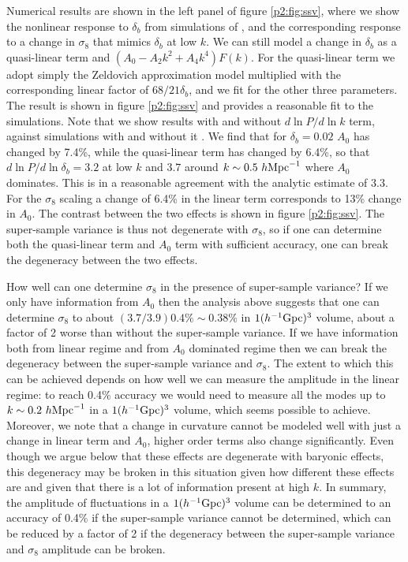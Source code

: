 \documentclass[
  11pt,
  twoside,
  openright,
  titlepage,
  headings=optiontoheadandtoc
]{scrbook}
\begin{document}
Numerical results are shown in the left panel of figure \ref{p2:fig:ssv}, where we show the nonlinear response to $\delta_b$ from 
simulations of \cite{2014PhRvD..89h3519L}, and the corresponding response to a change in $\sigma_8$ that mimics 
$\delta_b$ at low $k$. 
We can still model a change in $\delta_b$
as a quasi-linear term and $(A_0-A_2k^2+A_4k^4)F(k)$. For the quasi-linear term we adopt 
simply the Zeldovich approximation 
model multiplied with the corresponding linear factor of $68/21\delta_b$, and we fit for 
the other three parameters. The result is shown in figure \ref{p2:fig:ssv} and 
provides a reasonable fit to the simulations. Note that we show results with and without 
$d\ln P / d\ln k$ term, against simulations with and without it \citep{2014PhRvD..89h3519L}. 
We find that for 
$\delta_b=0.02$ $A_0$ has changed by 7.4\%, while the quasi-linear term has changed by 6.4\%, so that 
$d\ln P/d\ln \delta_b=3.2$ at low $k$ and $3.7$ around $k \sim 0.5\ h \rm{Mpc}^{-1}$ where $A_0$ dominates. This is 
in a reasonable agreement with the analytic estimate of 3.3. 
For the $\sigma_8$ scaling a change of 6.4\% in the linear term corresponds to 
13\% change in $A_0$. 
The contrast between the two effects is shown in figure \ref{p2:fig:ssv}. The super-sample variance 
is thus not degenerate with $\sigma_8$, so if one can determine both the quasi-linear term and 
$A_0$ term with sufficient accuracy, one can break the degeneracy between the two effects. 


How well can one determine $\sigma_8$ in the presence of super-sample variance? 
If we only have information from $A_0$ then the analysis above suggests that one can determine 
$\sigma_8$ to about $(3.7/3.9)0.4\% \sim 0.38\%$ in $1(h^{-1}{\rm Gpc})^3$ volume, about a factor of 2 worse than 
without the super-sample variance. If we have information both from linear regime and from $A_0$ 
dominated regime then we can break the degeneracy between the super-sample variance and $\sigma_8$. 
The extent to which this can be achieved depends on how well we can measure the amplitude in the 
linear regime: to reach 0.4\% accuracy we would need to measure all the modes up to $k \sim 0.2\ h \rm{Mpc}^{-1}$
in a $1(h^{-1}{\rm Gpc})^3$ volume, which seems possible to achieve. Moreover, we note that a change in 
curvature cannot be modeled well with just a change in linear term and $A_0$, higher order terms also 
change significantly. Even though we argue below that these effects are degenerate with baryonic effects, 
this degeneracy may be broken in this situation given how different these effects are and given that 
there is a lot of information present at high $k$. 
In summary, the amplitude of fluctuations in 
a $1(h^{-1}{\rm Gpc})^3$ volume can be determined to an accuracy of 0.4\% if the super-sample 
variance cannot be determined, which can be reduced by a factor of 2 if the degeneracy between the super-sample 
variance and $\sigma_8$ amplitude can be broken. 
\end{document}
